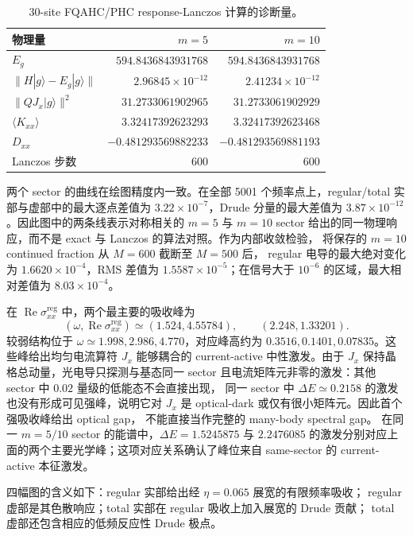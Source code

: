 \documentclass[11pt]{article}
\begin{document}
\begin{table}[H]
\centering
\small
\caption{30-site FQAHC/PHC response-Lanczos 计算的诊断量。}
\begin{tabular}{lrr}
\toprule
物理量 & \(m=5\) & \(m=10\) \\
\midrule
\(E_g\) & \(594.8436843931768\) & \(594.8436843931768\) \\
\(\lVert H|g\rangle-E_g|g\rangle\rVert\) &
\(2.96845\times10^{-12}\) & \(2.41234\times10^{-12}\) \\
\(\lVert QJ_x|g\rangle\rVert^2\) &
\(31.2733061902965\) & \(31.2733061902929\) \\
\(\langle K_{xx}\rangle\) & \(3.32417392623293\) & \(3.32417392623468\) \\
\(D_{xx}\) & \(-0.481293569882233\) & \(-0.481293569881193\) \\
Lanczos 步数 & 600 & 600 \\
\bottomrule
\end{tabular}
\end{table}

两个 sector 的曲线在绘图精度内一致。在全部 5001 个频率点上，regular/total
实部与虚部中的最大逐点差值为 \(3.22\times10^{-7}\)，Drude 分量的最大差值为
\(3.87\times10^{-12}\)。因此图中的两条线表示对称相关的 \(m=5\) 与 \(m=10\)
sector 给出的同一物理响应，而不是 exact 与 Lanczos 的算法对照。作为内部收敛检验，
将保存的 \(m=10\) continued fraction 从 \(M=600\) 截断至 \(M=500\) 后，
regular 电导的最大绝对变化为 \(1.6620\times10^{-4}\)，RMS 差值为
\(1.5587\times10^{-5}\)；在信号大于 \(10^{-6}\) 的区域，最大相对差值为
\(8.03\times10^{-4}\)。

在 \(\operatorname{Re}\sigma_{xx}^{\mathrm{reg}}\) 中，两个最主要的吸收峰为
\[
  (\omega,\operatorname{Re}\sigma_{xx}^{\mathrm{reg}})
  \simeq(1.524,4.55784),\qquad(2.248,1.33201).
\]
较弱结构位于 \(\omega\simeq1.998,2.986,4.770\)，对应峰高约为
\(0.3516,0.1401,0.07835\)。这些峰给出均匀电流算符 \(J_x\) 能够耦合的
current-active 中性激发。由于 \(J_x\) 保持晶格总动量，光电导只探测与基态同一
sector 且电流矩阵元非零的激发：其他 sector 中 \(0.02\) 量级的低能态不会直接出现，
同一 sector 中 \(\Delta E\simeq0.2158\) 的激发也没有形成可见强峰，说明它对
\(J_x\) 是 optical-dark 或仅有很小矩阵元。因此首个强吸收峰给出 optical gap，
不能直接当作完整的 many-body spectral gap。
在同一 \(m=5/10\) sector 的能谱中，\(\Delta E=1.5245875\) 与
\(2.2476085\) 的激发分别对应上面的两个主要光学峰；这项对应关系确认了峰位来自
same-sector 的 current-active 本征激发。

四幅图的含义如下：regular 实部给出经 \(\eta=0.065\) 展宽的有限频率吸收；
regular 虚部是其色散响应；total 实部在 regular 吸收上加入展宽的 Drude 贡献；
total 虚部还包含相应的低频反应性 Drude 极点。
\end{document}
